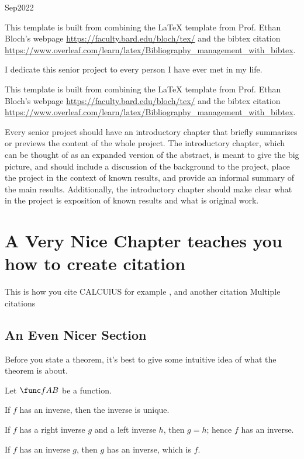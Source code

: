 \documentclass[11pt, twoside, reqno]{book}
\begin{document}
    {Sep}{2022}

\abstr
This template is built from combining the LaTeX template from Prof. Ethan Bloch's webpage \url{https://faculty.bard.edu/bloch/tex/} \cites{ethan} and the bibtex citation \url{https://www.overleaf.com/learn/latex/Bibliography_management_with_bibtex}. 


\tableofcontents

\dedic
I dedicate this senior project to every person I have ever met in my life.

\acknowl
 This template is built from combining the LaTeX template from Prof. Ethan Bloch's webpage \url{https://faculty.bard.edu/bloch/tex/} \cites{ethan} and the bibtex citation \url{https://www.overleaf.com/learn/latex/Bibliography_management_with_bibtex}.  

\startmain


\intro
Every senior project should have an introductory chapter that briefly summarizes or previews the content of the whole project.  The introductory chapter, which can be thought of as an expanded version of the abstract, is meant to give the big picture, and should include a discussion of the background to the project, place the project in the context of known results, and provide an informal summary of the main results.  Additionally, the introductory chapter should make clear what in the project is exposition of known results and what is original work.


\chapter{A Very Nice Chapter teaches you how to create citation}
\label{chapA}
This is how you cite CALCUlUS for example \cite{CALCULUS}, and another citation \cite{Kark:2006.} Multiple citations \cites{CALCULUS,HOMOLOGY,PROJECT}


\section{An Even Nicer Section}
\label{secA1}

Before you state a theorem, it's best to give some intuitive idea of what the theorem is about.

\thm\label{thmAA} 
Let $\func fAB$ be a function.
%
\enum 
\item\label{thmAA1}
If $f$ has an inverse, then the inverse is unique.
%
\item\label{thmAA2}
If $f$ has a right inverse $g$ and a left inverse $h$, then $g = h$; hence $f$ has an inverse.
%
\item\label{thmAA3}
If $f$ has an inverse $g$, then $g$ has an inverse, which is $f$.
\eenum
\ethm
 
\end{document}
